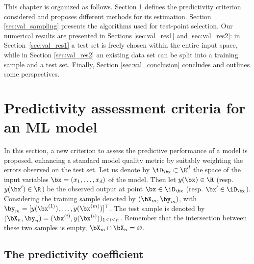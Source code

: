 This chapter is organized as follows. 
Section \ref{sec:q2} defines the predictivity criterion considered and proposes different methods for its estimation. 
Section \ref{sec:val_sampling} presents the algorithms used for test-point selection. 
Our numerical results are presented in Sections \ref{sec:val_res1} and \ref{sec:val_res2}: in Section~\ref{sec:val_res1} a test set is freely chosen within the entire input space, while in Section \ref{sec:val_res2} an existing data set can be split into a training sample and a test set. 
Finally, Section \ref{sec:val_conclusion} concludes and outlines some perspectives.




\section{Predictivity assessment criteria for an ML model}\label{sec:q2}
In this section, a new criterion to assess the predictive performance of a model is proposed, enhancing a standard model quality metric by suitably weighting the errors observed on the test set. 
Let us denote by $\iD_\bx \subset \R^d$ the space of the input variables $\bx=(x_1,\ldots,x_d)$ of the model. 
Then let $y(\bx) \in \R$ (resp. $y(\bx') \in \R$) be the observed output at point $\bx \in \iD_\bx$ (resp. $\bx' \in \iD_\bx$). 
Considering the training sample denoted by $(\bX_m,\by_m)$, with $\by_m = [y(\bx^{(1)}),\ldots,y(\bx^{(m)})]^\top$. 
The test sample is denoted by $(\bX_n,\by_n) = (\bx^{(i)},y(\bx^{(i)}))_{1\leq i \leq n}$. 
Remember that the intersection between these two samples is empty, $\bX_m \cap \bX_n = \varnothing$.


\subsection{The predictivity coefficient}

